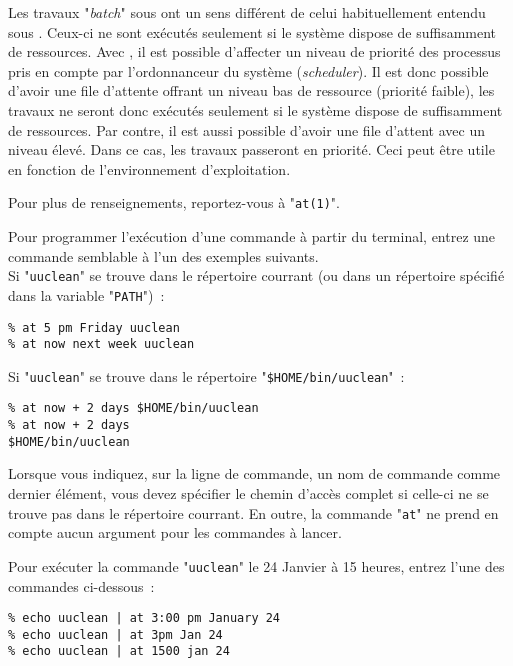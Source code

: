 \begin{remarque}
Les travaux "{\sl batch}" sous {\Unix} ont un sens diff{\'e}rent de celui
habituellement entendu sous {\OpenVMS}. Ceux-ci ne sont ex{\'e}cut{\'e}s seulement
si le syst{\`e}me dispose de suffisamment de ressources. Avec {\OpenVMS}, il est possible
d'affecter un niveau de priorit{\'e} des processus pris en compte par l'ordonnanceur du
syst{\`e}me ({\sl scheduler}). Il est donc possible d'avoir une file d'attente offrant
un niveau bas de ressource (priorit{\'e} faible), les travaux ne seront donc ex{\'e}cut{\'e}s
seulement si le syst{\`e}me dispose de suffisamment de ressources. Par contre, il est
aussi possible d'avoir une file d'attent avec un niveau {\'e}lev{\'e}. Dans ce cas, les travaux
passeront en priorit{\'e}. Ceci peut {\^e}tre utile en fonction de l'environnement
d'exploitation.
\end{remarque}

Pour plus de renseignements, reportez-vous {\`a} "{\tt at(1)}".

\begin{example}
Pour programmer l'ex{\'e}cution d'une commande {\`a} partir du terminal, entrez une commande 
semblable {\`a} l'un des exemples suivants.\\
Si "{\tt uuclean}" se trouve dans le r{\'e}pertoire courrant (ou dans un r{\'e}pertoire sp{\'e}cifi{\'e} dans la 
variable "{\tt PATH}")~:
\begin{verbatim}
% at 5 pm Friday uuclean
% at now next week uuclean
\end{verbatim}
Si "{\tt uuclean}" se trouve dans le r{\'e}pertoire "\verb=$HOME/bin/uuclean="~:
\begin{verbatim}
% at now + 2 days $HOME/bin/uuclean
% at now + 2 days
$HOME/bin/uuclean
\end{verbatim}
\end{example}

\begin{remarque}
Lorsque vous indiquez, sur la ligne de commande, un nom de commande
comme dernier {\'e}l{\'e}ment, vous devez sp{\'e}cifier le chemin d'acc{\`e}s complet si
celle-ci ne se trouve pas dans le r{\'e}pertoire courrant. En outre, la
commande "{\tt at}" ne prend en compte aucun argument pour les
commandes {\`a} lancer.
\end{remarque}

\begin{example}
Pour ex{\'e}cuter la commande "{\tt uuclean}" le 24 Janvier {\`a} 15 heures, entrez l'une des 
commandes ci-dessous~:
\begin{verbatim}
% echo uuclean | at 3:00 pm January 24
% echo uuclean | at 3pm Jan 24
% echo uuclean | at 1500 jan 24
\end{verbatim}
\end{example}

